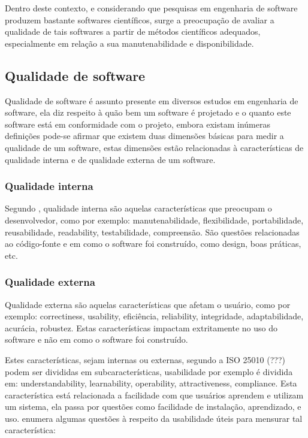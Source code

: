 \documentclass[12pt]{article}
\begin{document}
Dentro deste contexto, e considerando que pesquisas em engenharia de software
produzem bastante softwares científicos, surge a preocupação de avaliar a
qualidade de tais softwares a partir de métodos científicos adequados,
especialmente em relação a sua manutenabilidade e disponibilidade.

\subsection{Qualidade de software}

Qualidade de software é assunto presente em diversos estudos em engenharia de
software, ela diz respeito à quão bem um software é projetado e o quanto este
software está em conformidade com o projeto, embora existam inúmeras definições
\cite{Kitchenham1996} \cite{McConnell2004} \cite{Iso25022}
\cite{WikiBooksSoftwareEngineering} \cite{Staines2015} pode-se afirmar que
existem duas dimensões básicas para medir a qualidade de um software, estas
dimensões estão relacionadas à características de qualidade interna e de
qualidade externa de um software.

\subsubsection{Qualidade interna}

Segundo , qualidade interna são aquelas
características que preocupam o desenvolvedor, como por exemplo:
manutenabilidade, flexibilidade, portabilidade, reusabilidade, readability,
testabilidade, compreensão. São questões relacionadas ao código-fonte e em
como o software foi construído, como design, boas práticas, etc.

\subsubsection{Qualidade externa}

Qualidade externa são aquelas características que afetam o usuário, como por
exemplo: correctiness, usability, eficiência, reliability, integridade,
adaptabilidade, acurácia, robustez. Estas características impactam
extritamente no uso do software e não em como o software foi construído.

Estes características, sejam internas ou externas, segundo a ISO 25010 (???)
podem ser divididas em subcaracterísticas, usabilidade por exemplo é dividida
em: understandability, learnability, operability, attractiveness, compliance.
Esta característica está relacionada a facilidade com que usuários aprendem e
utilizam um sistema, ela passa por questões como facilidade de instalação,
aprendizado, e uso.  enumera algumas
questões à respeito da usabilidade úteis para mensurar tal característica:
\end{document}
